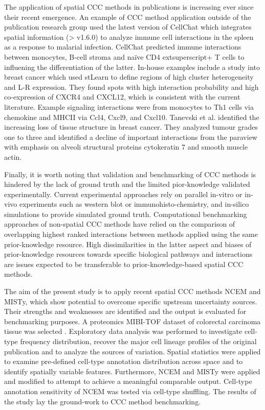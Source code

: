 The application of spatial CCC methods in publications is increasing ever since their recent emergence. An example of CCC method application outside of the publication research group used the latest version of CellChat which integrates spatial information (> v1.6.0) to analyze immune cell interactions in the spleen as a response to malarial infection\cite{Williams-2023}. CellChat predicted immune interactions between monocytes, B-cell stroma and naïve CD4	extsuperscript{+} T cells to influening the differentiation of the latter. In-house examples include a study into breast cancer which used stLearn to define regions of high cluster heterogeneity and L-R expression\cite{Pham-2020}. They found spots with high interaction probability and high co-expression of CXCR4 and CXCL12, which is consistent with the current literature.  Example signaling interactions were from monocytes to Th1 cells via chemokine and MHCII via Ccl4, Cxcl9, and Cxcl10. Tanevski et al. identified the increasing loss of tissue structure in breast cancer. They analyzed tumour grades one to three and identified a decline of important interactions from the paraview with emphasis on alveoli structural proteins cytokeratin 7 and smooth muscle actin.

Finally, it is worth noting that validation and benchmarking of CCC methods is hindered by the lack of ground truth and the limited pior-knowledge validated experimentally\cite{Almet-2021}\cite{Dimitrov-2021}. Current experimental approaches rely on parallel in-vitro or in-vivo experiments\cite{Sheikh-2019} such as western blot or immunohisto-chemistry, and in-silico simulations to provide simulated ground truth\cite{Tanevski-2022}. Computational benchmarking approaches of non-spatial CCC methods have relied on the comparison of overlapping highest ranked interactions between methods applied using the same prior-knowledge resource. High dissimilarities in the latter aspect and biases of prior-knowledge resources towards specific biological pathways and interactions are issues expected to be transferable to prior-knowledge-based spatial CCC methods.

The aim of the present study is to apply recent spatial CCC methods NCEM and MISTy, which show potential to overcome specific upstream uncertainty sources. Their strengths and weaknesses are identified and the output is evaluated for benchmarking purposes. A proteomics MIBI-TOF dataset of colorectal carcinoma tissue was selected \cite{Hartmann-2021}. Exploratory data analysis was performed to investigate cell-type frequency distribution, recover the major cell lineage profiles of the original publication and to analyze the sources of variation. Spatial statistics were applied to examine pre-defined cell-type annotation distribution across space and to identify spatially variable features. Furthermore, NCEM and MISTy were applied and modified to attempt to achieve a meaningful comparable output. Cell-type annotation sensitivity of NCEM was tested via cell-type shuffling. The results of the study lay the ground-work to CCC method benchmarking.